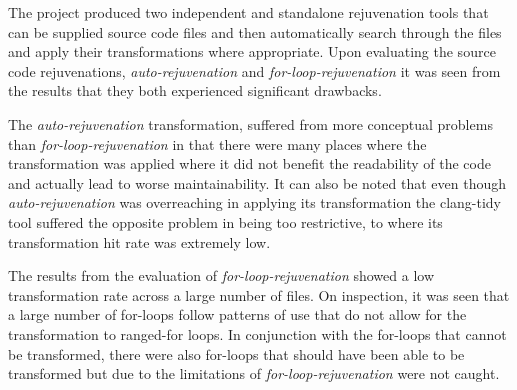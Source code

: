\documentclass[bsc,frontabs,singlespacing,twoside,parskip,deptreport]{infthesis}
\begin{document}
The project produced two independent and standalone rejuvenation tools that can be supplied source code files and then automatically search through the files and apply their transformations where appropriate. Upon evaluating the source code rejuvenations, \textit{auto-rejuvenation} and \textit{for-loop-rejuvenation} it was seen from the results that they both experienced significant drawbacks.

The \textit{auto-rejuvenation} transformation, suffered from more conceptual problems than \textit{for-loop-rejuvenation} in that there were many places where the transformation was applied where it did not benefit the readability of the code and actually lead to worse maintainability. It can also be noted that even though \textit{auto-rejuvenation} was overreaching in applying its transformation the clang-tidy tool suffered the opposite problem in being too restrictive, to where its transformation hit rate was extremely low.  

The results from the evaluation of \textit{for-loop-rejuvenation} showed a low transformation rate across a large number of files. On inspection, it was seen that a large number of for-loops follow patterns of use that do not allow for the transformation to ranged-for loops. In conjunction with the for-loops that cannot be transformed, there were also for-loops that should have been able to be transformed but due to the limitations of \textit{for-loop-rejuvenation} were not caught.



    
\end{document}
